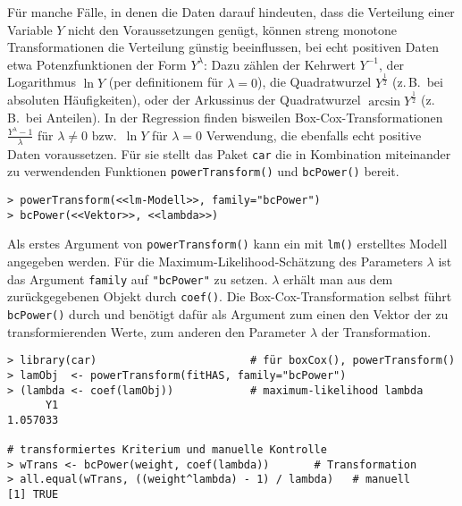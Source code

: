 Für manche Fälle, in denen die Daten darauf hindeuten, dass die Verteilung einer Variable $Y$ nicht den Voraussetzungen genügt, können streng monotone Transformationen die Verteilung günstig beeinflussen, bei echt positiven Daten etwa Potenzfunktionen der Form $Y^{\lambda}$: Dazu zählen der Kehrwert $Y^{-1}$, der Logarithmus $\ln Y$ (per definitionem für $\lambda = 0$), die Quadratwurzel $Y^{\frac{1}{2}}$ (z.\,B.\ bei absoluten Häufigkeiten), oder der Arkussinus der Quadratwurzel $\arcsin Y^{\frac{1}{2}}$ (z.\,B.\ bei Anteilen). In der Regression finden bisweilen Box-Cox-Transformationen $\frac{Y^{\lambda}-1}{\lambda}$ für $\lambda \neq 0$ bzw.\ $\ln Y$ für $\lambda = 0$ Verwendung, die ebenfalls echt positive Daten voraussetzen. Für sie stellt das Paket \lstinline!car! die in Kombination miteinander zu verwendenden Funktionen  \lstinline!powerTransform()! und \lstinline!bcPower()! bereit.
\begin{lstlisting}
> powerTransform(<<lm-Modell>>, family="bcPower")
> bcPower(<<Vektor>>, <<lambda>>)
\end{lstlisting}

Als erstes Argument von \lstinline!powerTransform()! kann ein mit \lstinline!lm()! erstelltes Modell angegeben werden. Für die Maximum-Likelihood-Schätzung des Parameters $\lambda$ ist das Argument \lstinline!family! auf \lstinline!"bcPower"! zu setzen. $\lambda$ erhält man aus dem zurückgegebenen Objekt durch \lstinline!coef()!. Die Box-Cox-Transformation selbst führt \lstinline!bcPower()! durch und benötigt dafür als Argument zum einen den Vektor der zu transformierenden Werte, zum anderen den Parameter $\lambda$ der Transformation.
\begin{lstlisting}
> library(car)                        # für boxCox(), powerTransform()
> lamObj  <- powerTransform(fitHAS, family="bcPower")
> (lambda <- coef(lamObj))            # maximum-likelihood lambda
      Y1
1.057033

# transformiertes Kriterium und manuelle Kontrolle
> wTrans <- bcPower(weight, coef(lambda))       # Transformation
> all.equal(wTrans, ((weight^lambda) - 1) / lambda)   # manuell
[1] TRUE
\end{lstlisting}

